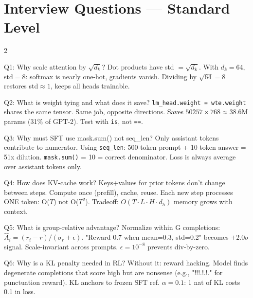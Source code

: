 \documentclass[10pt,a4paper]{article}
\begin{document}
\section{Interview Questions --- Standard Level}

\begin{multicols}{2}
\footnotesize

\begin{interviewbox}{Q1: Why scale attention by $\sqrt{d_k}$?}
Dot products have std $= \sqrt{d_k}$.
With $d_k=64$, std$=8$: softmax is nearly one-hot, gradients vanish.
Dividing by $\sqrt{64}=8$ restores std$\approx1$, keeps all heads trainable.
\end{interviewbox}

\begin{interviewbox}{Q2: What is weight tying and what does it save?}
\texttt{lm\_head.weight = wte.weight} shares the same tensor.
Same job, opposite directions. Saves $50257\times768 \approx 38.6$M params (31\% of GPT-2).
Test with \texttt{is}, not \texttt{==}.
\end{interviewbox}

\begin{interviewbox}{Q3: Why must SFT use mask.sum() not seq\_len?}
Only assistant tokens contribute to numerator.
Using \texttt{seq\_len}: 500-token prompt + 10-token answer = 51x dilution.
\texttt{mask.sum()} = 10 = correct denominator. Loss is always average over assistant tokens only.
\end{interviewbox}

\begin{interviewbox}{Q4: How does KV-cache work?}
Keys+values for prior tokens don't change between steps.
Compute once (prefill), cache, reuse.
Each new step processes ONE token: O($T$) not O($T^2$).
Tradeoff: $O(T\cdot L\cdot H\cdot d_h)$ memory grows with context.
\end{interviewbox}

\begin{interviewbox}{Q5: What is group-relative advantage?}
Normalize within G completions: $\hat{A}_i=(r_i-\bar{r})/(\sigma_r+\epsilon)$.
"Reward 0.7 when mean=0.3, std=0.2" becomes $+2.0\sigma$ signal.
Scale-invariant across prompts.
$\epsilon=10^{-8}$ prevents div-by-zero.
\end{interviewbox}

\begin{interviewbox}{Q6: Why is a KL penalty needed in RL?}
Without it: reward hacking.
Model finds degenerate completions that score high but are nonsense
(e.g., "!!!.!.!." for punctuation reward).
KL anchors to frozen SFT ref.
$\alpha=0.1$: 1 nat of KL costs 0.1 in loss.
\end{interviewbox}


\end{multicols}
\end{document}
